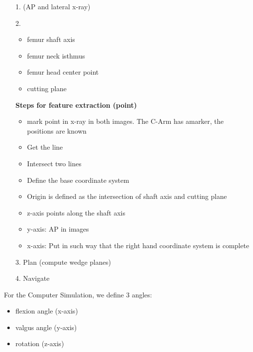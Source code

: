 \documentclass{exerciseBlue}
\newcommand{\cmark}{\ding{51}}%
\begin{document}
\begin{enumerate}
	\item[1.] \cmark (AP and lateral x-ray)
	\item[2.] \begin{itemize}
		\item femur shaft axis
		\item femur neck isthmus
		\item femur head center point
		\item cutting plane
	\end{itemize}
	\textbf{Steps for feature extraction (point)}
	\begin{itemize}
		\item mark point in x-ray in both images. The C-Arm has amarker, the positions are known
		\item Get the line
		\item Intersect two lines
		\item Define the base coordinate system
		\item Origin is defined as the intersection of shaft axis and cutting plane
		\item z-axis points along the shaft axis
		\item y-axis: AP in images
		\item x-axis: Put in such way that the right hand coordinate system is complete
	\end{itemize}
	\item[3.] Plan (compute wedge planes)
	\item[4.] Navigate
\end{enumerate}
For the Computer Simulation, we define 3 angles:
\begin{itemize}
	\item flexion angle (x-axis)
	\item valgus angle (y-axis)
	\item rotation (z-axis)
\end{itemize}
\end{document}
